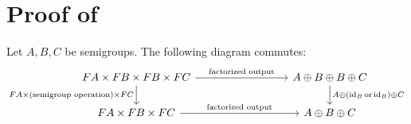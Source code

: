 \section{Proof of }


\begin{lemma}\label{lem:merge-middle}
    Let $A,B,C$ be semigroups. The following diagram commutes:
    \[\begin{tikzcd}
        [column sep=3cm]
        \functor A \times \functor B\times \functor B \times \functor C
        \ar[r,"\text{factorized output}"]
        \ar[d,"\functor A \times (\text{semigroup operation}) \times \functor C"']
        &
        A \oplus B \oplus B \oplus C
        \ar[d,"A \oplus (\mathrm{id}_B\,\text{or}\,\mathrm{id}_B) \oplus C"]
        \\
        \functor A \times \functor B \times \functor C
        \ar[r,"\text{factorized output}"]
        &
        A \oplus B \oplus C
    \end{tikzcd}\]
\end{lemma}
